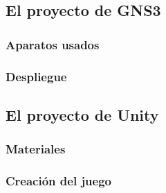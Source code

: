 \subsection{El proyecto de GNS3}


\subsubsection{Aparatos usados}

\subsubsection{Despliegue}

\subsection{El proyecto de Unity}

\subsubsection{Materiales}

\subsubsection{Creación del juego}
